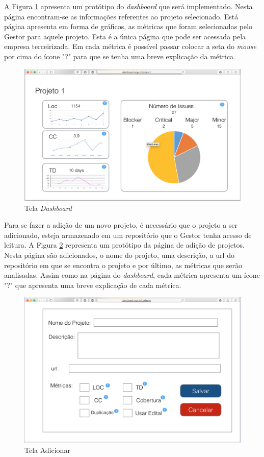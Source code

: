 A Figura \ref{img:telaDashboard} apresenta um protótipo do \textit{dashboard} que será implementado. Nesta página encontram-se as informações referentes ao projeto selecionado. Está página apresenta em forma de gráficos, as métricas que foram selecionadas pelo Gestor para aquele projeto. Esta é a única página que pode ser acessada pela empresa terceirizada. Em cada métrica é possível passar colocar a seta do \textit{mouse} por cima do ícone "?" para que se tenha uma breve explicação da métrica 

\graphicspath{{figuras/}}
\begin{figure}
\centering
\includegraphics[scale=0.60]{telaDashboard.png}
\caption{Tela \textit{Dashboard}}
\label{img:telaDashboard}
\end{figure} 

Para se fazer a adição de um novo projeto, é necessário que o projeto a ser adicionado, esteja armazenado em um repositório que o Gestor tenha acesso de leitura. A Figura \ref{img:telaAdicionar} representa um protótipo da página de adição de projetos. Nesta página são adicionados, o nome do projeto, uma descrição, a url do repositório em que se encontra o projeto e por último, as métricas que serão analisadas. Assim como na página do \textit{dashboard}, cada métrica apresenta um ícone "?" que apresenta uma breve explicação de cada métrica.

\graphicspath{{figuras/}}
\begin{figure}
\centering
\includegraphics[scale=0.60]{telaAdicionar.png}
\caption{Tela Adicionar}
\label{img:telaAdicionar}
\end{figure} 

